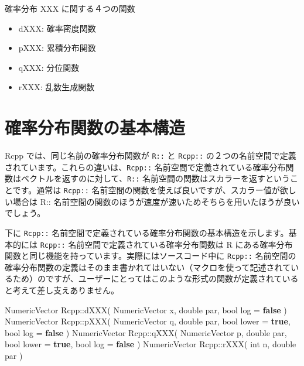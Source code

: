 \documentclass[]{book}
\newenvironment{Shaded}{\begin{snugshade}}{\end{snugshade}}
\newcommand{\DataTypeTok}[1]{\textcolor[rgb]{0.13,0.29,0.53}{#1}}
\newcommand{\KeywordTok}[1]{\textcolor[rgb]{0.13,0.29,0.53}{\textbf{#1}}}
\newcommand{\NormalTok}[1]{#1}
\providecommand{\tightlist}{%
  \setlength{\itemsep}{0pt}\setlength{\parskip}{0pt}}
\begin{document}
確率分布 XXX に関する４つの関数

\begin{itemize}
\tightlist
\item
  dXXX: 確率密度関数
\item
  pXXX: 累積分布関数
\item
  qXXX: 分位関数
\item
  rXXX: 乱数生成関数
\end{itemize}

\section{確率分布関数の基本構造}

Rcpp では、同じ名前の確率分布関数が \texttt{R::} と \texttt{Rcpp::} の２つの名前空間で定義されています。これらの違いは、\texttt{Rcpp::} 名前空間で定義されている確率分布関数はベクトルを返すのに対して、\texttt{R::} 名前空間の関数はスカラーを返すということです。通常は \texttt{Rcpp::} 名前空間の関数を使えば良いですが、スカラー値が欲しい場合は R:: 名前空間の関数のほうが速度が速いためそちらを用いたほうが良いでしょう。

下に \texttt{Rcpp::} 名前空間で定義されている確率分布関数の基本構造を示します。基本的には \texttt{Rcpp::} 名前空間で定義されている確率分布関数は R にある確率分布関数と同じ機能を持っています。実際にはソースコード中に \texttt{Rcpp::} 名前空間の確率分布関数の定義はそのまま書かれてはいない（マクロを使って記述されているため）のですが、ユーザーにとってはこのような形式の関数が定義されていると考えて差し支えありません。

\begin{Shaded}
\begin{Highlighting}[]
\NormalTok{NumericVector Rcpp::dXXX( NumericVector x, }\DataTypeTok{double}\NormalTok{ par,                    }\DataTypeTok{bool}\NormalTok{ log = }\KeywordTok{false}\NormalTok{ )}
\NormalTok{NumericVector Rcpp::pXXX( NumericVector q, }\DataTypeTok{double}\NormalTok{ par, }\DataTypeTok{bool}\NormalTok{ lower = }\KeywordTok{true}\NormalTok{, }\DataTypeTok{bool}\NormalTok{ log = }\KeywordTok{false}\NormalTok{ )}
\NormalTok{NumericVector Rcpp::qXXX( NumericVector p, }\DataTypeTok{double}\NormalTok{ par, }\DataTypeTok{bool}\NormalTok{ lower = }\KeywordTok{true}\NormalTok{, }\DataTypeTok{bool}\NormalTok{ log = }\KeywordTok{false}\NormalTok{ )}
\NormalTok{NumericVector Rcpp::rXXX(           }\DataTypeTok{int}\NormalTok{ n, }\DataTypeTok{double}\NormalTok{ par )}
\end{Highlighting}
\end{Shaded}
\end{document}
